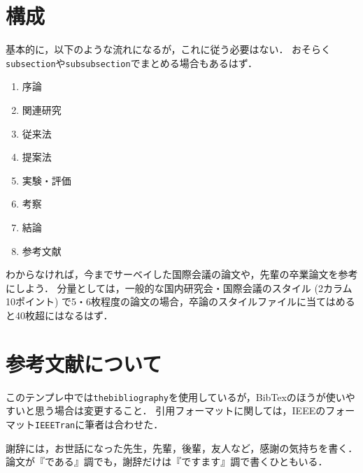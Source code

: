 \section{構成}
基本的に，以下のような流れになるが，これに従う必要はない．
おそらく{\tt subsection}や{\tt subsubsection}でまとめる場合もあるはず．

\begin{enumerate}
	\item 序論
	\item 関連研究
	\item 従来法
	\item 提案法
	\item 実験・評価
	\item 考察
	\item 結論
	\item 参考文献
\end{enumerate}

わからなければ，今までサーベイした国際会議の論文や，先輩の卒業論文を参考にしよう．
分量としては，一般的な国内研究会・国際会議のスタイル (2カラム10ポイント) で5・6枚程度の論文の場合，卒論のスタイルファイルに当てはめると40枚超にはなるはず．

\section{参考文献について}
このテンプレ中では{\tt thebibliography}を使用しているが，BibTexのほうが使いやすいと思う場合は変更すること．
引用フォーマットに関しては，IEEEのフォーマット{\tt IEEETran}に筆者は合わせた．

\begin{acknowledgment}

謝辞には，お世話になった先生，先輩，後輩，友人など，感謝の気持ちを書く．論文が『である』調でも，謝辞だけは『ですます』調で書くひともいる．

\end{acknowledgment}

